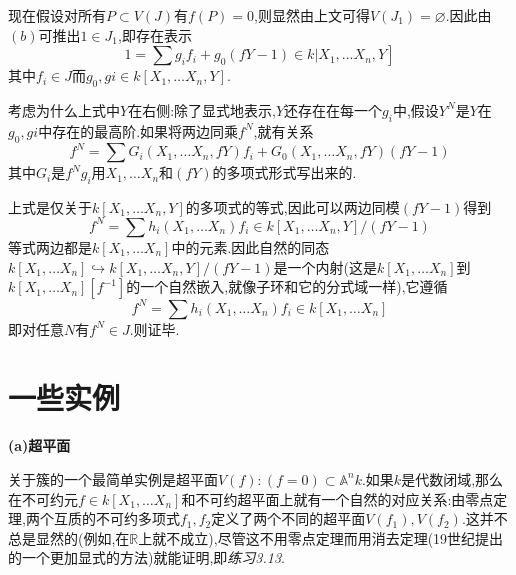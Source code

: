 \documentclass[UTF8]{book}
\begin{document}
		
		现在假设对所有$ P \subset V(J) $有$ f(P) = 0 $,则显然由上文可得$ V(J_{1}) = \varnothing $.因此由$ (b) $可推出$ 1 \in J_{1}$,即存在表示
		\begin{equation*}
		\left.1=\sum g_{i} f_{i}+g_{0}(f Y-1) \in k | X_{1}, \ldots X_{n}, Y\right]
		\end{equation*}
		其中$ f_{i} \in J $而$ g_{0},g{i} \in k \left[ X _{1}, \ldots X _{ n }, Y \right] $.
		
		
		考虑为什么上式中$ Y $在右侧:除了显式地表示,$ Y $还存在在每一个$ g_{i} $中,假设$ Y^{N} $是$ Y $在$ g_{0},g{i} $中存在的最高阶.如果将两边同乘$ f^{N} $,就有关系
		\begin{equation*}
		f ^{ N }=\sum G _{ i }\left(X _{1}, \ldots X _{ n }, f Y \right) f _{ i }+ G _{0}\left(X _{1}, \ldots X _{ n }, fY \right)(fY -1)
		\end{equation*}
		其中$ G_{i} $是$ f^{N}g_{i} $用$ X _{1}, \ldots X _{ n } $和$ (fY) $的多项式形式写出来的.
		
		
		上式是仅关于$ k \left[ X _{1}, \ldots X _{ n }, Y \right] $的多项式的等式,因此可以两边同模$ (fY -1) $得到
		\begin{equation*}
		f ^{ N }=\sum h _{ i }\left(X _{1}, \ldots X _{ n }\right) f _{ i } \in k \left[ X_{1}, \ldots X _{ n }, Y \right] /(f Y -1)
		\end{equation*}
		等式两边都是$ k \left[ X _{1}, \ldots X _{ n }\right] $中的元素.因此自然的同态$ k \left[ X _{1}, \ldots X _{ n }\right] \hookrightarrow k \left[ X _{1}, \ldots X _{ n }, Y \right] /(f Y -1)$是一个内射(这是$ k \left[ X _{1}, \ldots X _{ n }\right] $到$ k \left[ X _{1}, \ldots X _{ n }\right][f^{-1}] $的一个自然嵌入,就像子环和它的分式域一样),它遵循
		\begin{equation*}
		f ^{ N }=\sum h _{ i }\left(X _{1}, \ldots X _{ n }\right) f _{ i } \in k \left[ X _{1}, \ldots X _{ n }\right]
		\end{equation*}
		即对任意$ N $有$ f^{N} \in J $.则证毕.
		
		
	\section{一些实例}
		\textbf{(a)超平面}
		
		
		关于簇的一个最简单实例是超平面$V (f ):(f =0) \subset \mathbb{A} ^{ n } k$.如果$ k $是代数闭域,那么在不可约元$f \in k \left[ X _{1}, \dots X _{ n }\right]$和不可约超平面上就有一个自然的对应关系:由零点定理,两个互质的不可约多项式$ f_{1},f_{2} $定义了两个不同的超平面$ V(f_{1}),V(f_{2}) $.这并不总是显然的(例如,在$ \mathbb{R} $上就不成立),尽管这不用零点定理而用消去定理(19世纪提出的一个更加显式的方法)就能证明,即\textit{练习3.13}.
		
\end{document}
